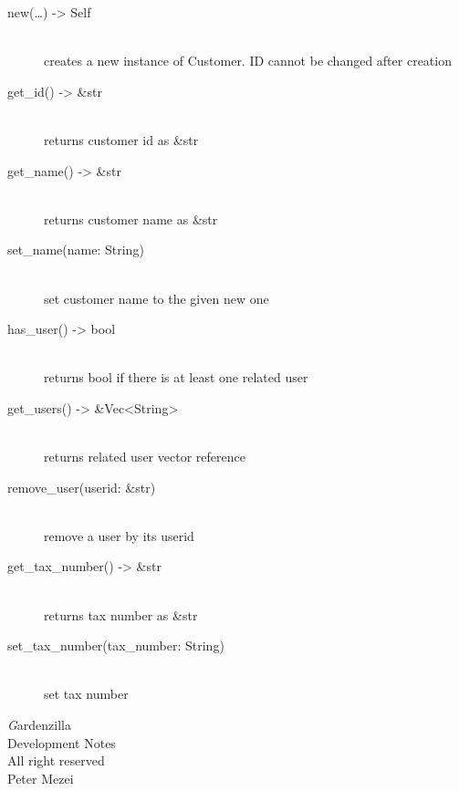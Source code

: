 \documentclass{article}
\begin{document}
\begin{description}
  \item[new(\dots) -> Self] \hfill
    \\ creates a new instance of Customer. ID cannot be changed after
    creation
  \item[get\_id() -> \&str] \hfill
    \\ returns customer id as \&str
  \item[get\_name() -> \&str] \hfill
    \\ returns customer name as \&str
  \item[set\_name(name: String)] \hfill
    \\ set customer name to the given new one
  \item[has\_user() -> bool] \hfill
    \\ returns bool if there is at least one related user
  \item[get\_users() -> \&Vec<String>] \hfill
    \\ returns related user vector reference
  \item[remove\_user(userid: \&str)]  \hfill
    \\ remove a user by its userid
  \item[get\_tax\_number() -> \&str] \hfill
    \\ returns tax number as \&str
  \item[set\_tax\_number(tax\_number: String)] \hfill
    \\ set tax number
\end{description}

\newpage
\todototoc
\listoftodos

\newpage
\thispagestyle{empty}
\vspace*{5cm}
\begin{center}
  {\textit Gardenzilla\\ Development Notes \\ \vspace{5mm} All right reserved \\ Peter Mezei \\\the\year{}}
\end{center}
\end{document}
